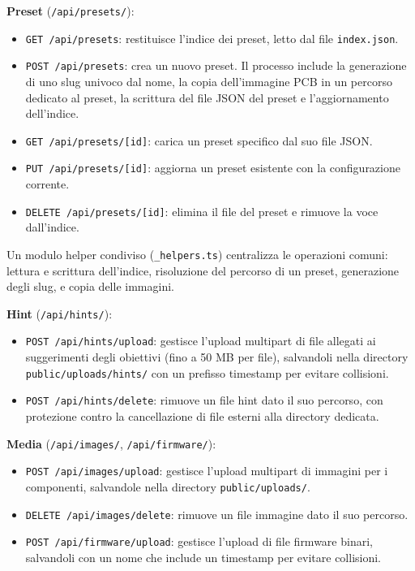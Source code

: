 \textbf{Preset} (\texttt{/api/presets/}):
\begin{itemize}
    \item \texttt{GET /api/presets}: restituisce l'indice dei preset, letto dal file \texttt{index.json}.
    \item \texttt{POST /api/presets}: crea un nuovo preset. Il processo include la generazione di uno slug univoco dal nome, la copia dell'immagine PCB in un percorso dedicato al preset, la scrittura del file JSON del preset e l'aggiornamento dell'indice.
    \item \texttt{GET /api/presets/[id]}: carica un preset specifico dal suo file JSON.
    \item \texttt{PUT /api/presets/[id]}: aggiorna un preset esistente con la configurazione corrente.
    \item \texttt{DELETE /api/presets/[id]}: elimina il file del preset e rimuove la voce dall'indice.
\end{itemize}

Un modulo helper condiviso (\texttt{\_helpers.ts}) centralizza le operazioni comuni: lettura e scrittura dell'indice, risoluzione del percorso di un preset, generazione degli slug, e copia delle immagini.

\textbf{Hint} (\texttt{/api/hints/}):
\begin{itemize}
    \item \texttt{POST /api/hints/upload}: gestisce l'upload multipart di file allegati ai suggerimenti degli obiettivi (fino a 50 MB per file), salvandoli nella directory \texttt{public/uploads/hints/} con un prefisso timestamp per evitare collisioni.
    \item \texttt{POST /api/hints/delete}: rimuove un file hint dato il suo percorso, con protezione contro la cancellazione di file esterni alla directory dedicata.
\end{itemize}

\textbf{Media} (\texttt{/api/images/}, \texttt{/api/firmware/}):
\begin{itemize}
    \item \texttt{POST /api/images/upload}: gestisce l'upload multipart di immagini per i componenti, salvandole nella directory \texttt{public/uploads/}.
    \item \texttt{DELETE /api/images/delete}: rimuove un file immagine dato il suo percorso.
    \item \texttt{POST /api/firmware/upload}: gestisce l'upload di file firmware binari, salvandoli con un nome che include un timestamp per evitare collisioni.
\end{itemize}

